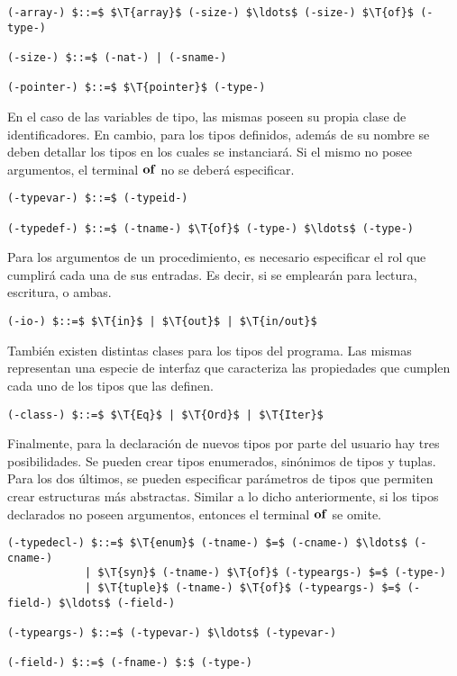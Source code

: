 \documentclass{article}
\begin{document}
\begin{lstlisting}[style = syntax]
(-array-) $::=$ $\T{array}$ (-size-) $\ldots$ (-size-) $\T{of}$ (-type-)

(-size-) $::=$ (-nat-) | (-sname-)

(-pointer-) $::=$ $\T{pointer}$ (-type-)
\end{lstlisting}

En el caso de las variables de tipo, las mismas poseen su propia clase de identificadores.
En cambio, para los tipos definidos, además de su nombre se deben detallar los tipos en los cuales se instanciará.
Si el mismo no posee argumentos, el terminal $\mathbf{of}$ no se deberá especificar.

\begin{lstlisting}[style = syntax]
(-typevar-) $::=$ (-typeid-)

(-typedef-) $::=$ (-tname-) $\T{of}$ (-type-) $\ldots$ (-type-)
\end{lstlisting}

Para los argumentos de un procedimiento, es necesario especificar el rol que cumplirá cada una de sus entradas.
Es decir, si se emplearán para lectura, escritura, o ambas.

\begin{lstlisting}[style = syntax]
(-io-) $::=$ $\T{in}$ | $\T{out}$ | $\T{in/out}$
\end{lstlisting}

También existen distintas clases para los tipos del programa.
Las mismas representan una especie de interfaz que caracteriza las propiedades que cumplen cada uno de los tipos que las definen.

\begin{lstlisting}[style = syntax]
(-class-) $::=$ $\T{Eq}$ | $\T{Ord}$ | $\T{Iter}$
\end{lstlisting}

Finalmente, para la declaración de nuevos tipos por parte del usuario hay tres posibilidades.
Se pueden crear tipos enumerados, sinónimos de tipos y tuplas.
Para los dos últimos, se pueden especificar parámetros de tipos que permiten crear estructuras más abstractas.
Similar a lo dicho anteriormente, si los tipos declarados no poseen argumentos, entonces el terminal $\mathbf{of}$ se omite.

\begin{lstlisting}[style = syntax]
(-typedecl-) $::=$ $\T{enum}$ (-tname-) $=$ (-cname-) $\ldots$ (-cname-)
            | $\T{syn}$ (-tname-) $\T{of}$ (-typeargs-) $=$ (-type-)
            | $\T{tuple}$ (-tname-) $\T{of}$ (-typeargs-) $=$ (-field-) $\ldots$ (-field-)

(-typeargs-) $::=$ (-typevar-) $\ldots$ (-typevar-)

(-field-) $::=$ (-fname-) $:$ (-type-)
\end{lstlisting}
\end{document}
